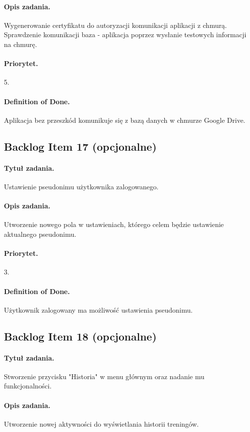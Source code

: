 \documentclass[a4paper]{article}
\begin{document}
\paragraph{Opis zadania.} Wygenerowanie certyfikatu do autoryzacji komunikacji aplikacji z chmurą. Sprawdzenie komunikacji baza - aplikacja poprzez wysłanie testowych informacji na chmurę.
\paragraph{Priorytet.} 5.
\paragraph{Definition of Done.} Aplikacja bez przeszkód komunikuje się z bazą danych w chmurze Google Drive.

\subsection{Backlog Item 17 (opcjonalne)}
\paragraph{Tytuł zadania.} Ustawienie pseudonimu użytkownika zalogowanego.
\paragraph{Opis zadania.} Utworzenie nowego pola w ustawieniach, którego celem będzie ustawienie aktualnego pseudonimu.
\paragraph{Priorytet.} 3.
\paragraph{Definition of Done.} Użytkownik zalogowany ma możliwość ustawienia pseudonimu.

\subsection{Backlog Item 18 (opcjonalne)}
\paragraph{Tytuł zadania.} Stworzenie przycisku "Historia" w menu głównym oraz nadanie mu funkcjonalności.
\paragraph{Opis zadania.} Utworzenie nowej aktywności do wyświetlania historii treningów.
\end{document}
